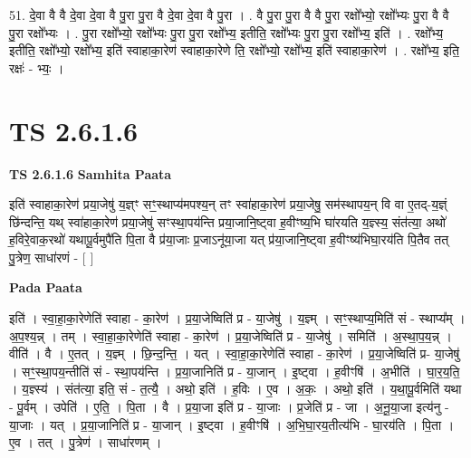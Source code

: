 \documentclass[17pt]{extarticle}
\begin{document}
51. दे॒वा वै वै दे॒वा दे॒वा वै पु॒रा पु॒रा वै दे॒वा दे॒वा वै पु॒रा । . वै पु॒रा पु॒रा वै वै पु॒रा रक्षो᳚भ्यो॒ रक्षो᳚भ्यः पु॒रा वै वै पु॒रा रक्षो᳚भ्यः । . पु॒रा रक्षो᳚भ्यो॒ रक्षो᳚भ्यः पु॒रा पु॒रा रक्षो᳚भ्य॒ इतीति॒ रक्षो᳚भ्यः पु॒रा पु॒रा रक्षो᳚भ्य॒ इति॑ । . रक्षो᳚भ्य॒ इतीति॒ रक्षो᳚भ्यो॒ रक्षो᳚भ्य॒ इति॑ स्वाहाका॒रेण॑ स्वाहाका॒रेणे ति॒ रक्षो᳚भ्यो॒ रक्षो᳚भ्य॒ इति॑ स्वाहाका॒रेण॑ । . रक्षो᳚भ्य॒ इति॒ रक्षः॑ - भ्यः॒ । \newline
\pagebreak
{}
\section*{ TS 2.6.1.6 }

\textbf{TS 2.6.1.6 } \newline
\textbf{Samhita Paata} \newline

इति॑ स्वाहाका॒रेण॑ प्रया॒जेषु॑ य॒ज्ञ्ꣳ सꣳ॒॒स्थाप्य॑मपश्य॒न् तꣳ स्वा॑हाका॒रेण॑ प्रया॒जेषु॒ सम॑स्थापय॒न् वि वा ए॒तद्-य॒ज्ञ्ं छि॑न्दन्ति॒ यथ् स्वा॑हाका॒रेण॑ प्रया॒जेषु॑ सꣳस्था॒पय॑न्ति प्रया॒जानि॒ष्ट्वा ह॒वीꣳष्य॒भि घा॑रयति य॒ज्ञ्स्य॒ संत॑त्या॒ अथो॑ ह॒विरे॒वाक॒रथो॑ यथापू॒र्वमुपै॑ति पि॒ता वै प्र॑या॒जाः प्र॒जाऽनू॑या॒जा यत् प्र॑या॒जानि॒ष्ट्वा ह॒वीꣳष्य॑भिघा॒रय॑ति पि॒तैव तत् पु॒त्रेण॒ साधा॑रणं - [  ] \newline

\textbf{Pada Paata} \newline

इति॑ । स्वा॒हा॒का॒रेणेति॑ स्वाहा - का॒रेण॑ । प्र॒या॒जेष्विति॑ प्र - या॒जेषु॑ । य॒ज्ञ्म् । सꣳ॒॒स्थाप्य॒मिति॑ सं - स्थाप्य᳚म् । अ॒प॒श्य॒न्न् । तम् । स्वा॒हा॒का॒रेणेति॑ स्वाहा - का॒रेण॑ । प्र॒या॒जेष्विति॑ प्र - या॒जेषु॑ । समिति॑ । अ॒स्था॒प॒य॒न्न् । वीति॑ । वै । ए॒तत् । य॒ज्ञ्म् । छि॒न्द॒न्ति॒ । यत् । स्वा॒हा॒का॒रेणेति॑ स्वाहा - का॒रेण॑ । प्र॒या॒जेष्विति॑ प्र- या॒जेषु॑ । सꣳ॒॒स्था॒पय॒न्तीति॑ सं - स्था॒पय॑न्ति । प्र॒या॒जानिति॑ प्र - या॒जान् । इ॒ष्ट्वा । ह॒वीꣳषि॑ । अ॒भीति॑ । घा॒र॒य॒ति॒ । य॒ज्ञ्स्य॑ । संत॑त्या॒ इति॒ सं - त॒त्यै॒ । अथो॒ इति॑ । ह॒विः । ए॒व । अ॒कः॒ । अथो॒ इति॑ । य॒था॒पू॒र्वमिति॑ यथा - पू॒र्वम् । उपेति॑ । ए॒ति॒ । पि॒ता । वै । प्र॒या॒जा इति॑ प्र - या॒जाः । प्र॒जेति॑ प्र - जा । अ॒नू॒या॒जा इत्य॑नु - या॒जाः । यत् । प्र॒या॒जानिति॑ प्र - या॒जान् । इ॒ष्ट्वा । ह॒वीꣳषि॑ । अ॒भि॒घा॒रय॒तीत्य॑भि - घा॒रय॑ति । पि॒ता । ए॒व । तत् । पु॒त्रेण॑ । साधा॑रणम् ।  \newline
\end{document}

